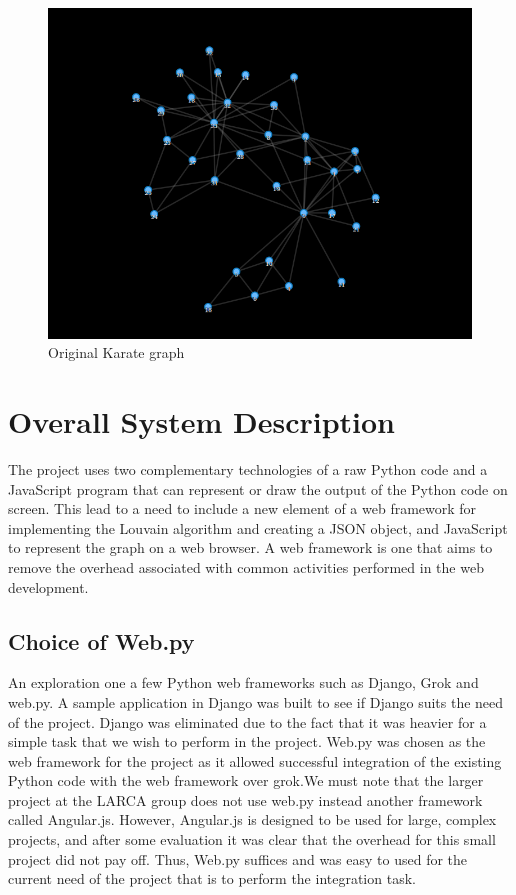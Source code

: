 \begin{figure}[H]
\centering
\includegraphics[scale=0.3]{o3.png}
\caption{\label{o3}Original Karate graph}
\end{figure}

\chapter{Overall System Description}
The project uses two complementary technologies of a raw Python code and a JavaScript program that can represent or draw the output of the Python code on screen. This lead to a need to include a new element of a web framework for implementing the Louvain algorithm and creating a JSON object, and JavaScript to represent the graph on a web browser.   A web framework is one that aims to remove the overhead associated with common activities performed in the web development. 
\section{Choice of Web.py}
An exploration one a few Python web frameworks such as Django, Grok and web.py. A sample application in Django was built to see if Django suits the need of the project. Django was eliminated due to the fact that it was heavier for a simple task that we wish to perform in the project. Web.py was chosen as the web framework for the project as it allowed successful integration  of the existing Python code with the web framework over grok.We must note that the larger project at the LARCA group does not use web.py instead another framework called Angular.js. However, Angular.js is designed to be used for large, complex projects, and after some evaluation it was clear that the overhead for this small project did not pay off. 
Thus, Web.py suffices and was easy to used for the current need of the project that is to perform the integration task.  


